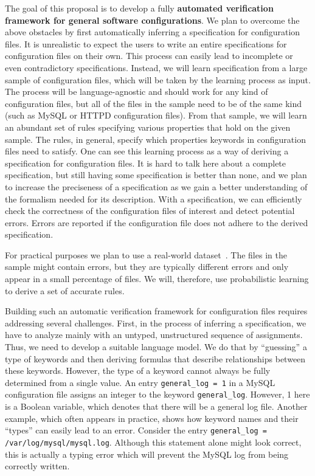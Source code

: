 The goal of this proposal is to develop a fully {\bf {automated 
verification  framework for general software configurations}}. We plan to
overcome the above obstacles by first automatically inferring a
specification for configuration files. It is unrealistic to expect the 
users to write an entire specifications for configuration files on their own. 
This process can easily lead to incomplete or even contradictory 
specifications. Instead, we will learn specification from 
a large sample of 
configuration files,%
which will be taken by the learning process as input.
The process will be language-agnostic and should work for any kind 
of configuration files,  but all of the files in the sample need to be of 
the same kind (such as MySQL or 
HTTPD configuration files). From that sample, we will learn an abundant set of rules 
specifying various properties that hold on the given sample. The rules, in general, 
specify which properties keywords in configuration files need to satisfy. One can see this learning process as 
a way of deriving  a specification for configuration files. 
It is hard to talk here about a complete specification, but 
still having some specification is better than none, and we plan to 
increase the preciseness of a specification as we gain a better 
understanding of the formalism needed for its description.
With a specification, we can efficiently check 
the correctness of the configuration files of interest and detect 
potential errors. Errors are reported if the configuration file does not 
adhere to the derived specification.

For practical purposes we plan to use a real-world dataset~\cite{configdataset}. The 
files in the sample might contain
errors, but they are typically different errors and only appear in a small percentage of 
files. We will, therefore, use probabilistic learning to derive a set of accurate rules. 

Building such an automatic verification framework for
configuration files requires addressing several challenges. 
First, in the process of inferring a specification, we have to 
analyze mainly with an untyped, unstructured sequence of assignments.
Thus, we need to develop a suitable language model. We do that by 
``guessing'' a type of keywords and then deriving formulas that
describe relationships between these keywords. However, the
type of a keyword cannot always be fully determined 
from a single value. 
An entry {\tt general\_log = 1} in a MySQL configuration file assigns an integer to the 
keyword {\tt general\_log}. However, 1 here is a Boolean variable,
which denotes that there will be a general log file.
Another example, which often appears in practice, shows how keyword names and 
their ``types'' can easily lead to an error. Consider the
entry {\tt general\_log = /var/log/mysql/mysql.log}. Although this statement 
alone might look correct, this is actually a typing error which will prevent the MySQL log from being correctly written.

